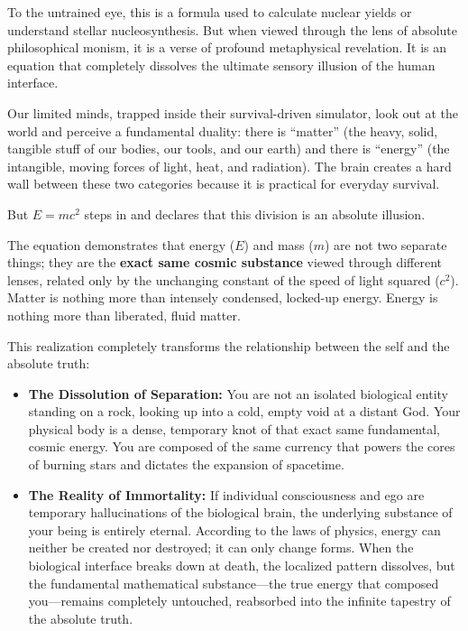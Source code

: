 \documentclass[12pt]{article}
\begin{document}
To the untrained eye, this is a formula used to calculate nuclear yields or understand stellar nucleosynthesis. But when viewed through the lens of absolute philosophical monism, it is a verse of profound metaphysical revelation. It is an equation that completely dissolves the ultimate sensory illusion of the human interface.

Our limited minds, trapped inside their survival-driven simulator, look out at the world and perceive a fundamental duality: there is ``matter'' (the heavy, solid, tangible stuff of our bodies, our tools, and our earth) and there is ``energy'' (the intangible, moving forces of light, heat, and radiation). The brain creates a hard wall between these two categories because it is practical for everyday survival. 

But $E=mc^2$ steps in and declares that this division is an absolute illusion. 

The equation demonstrates that energy ($E$) and mass ($m$) are not two separate things; they are the \textbf{exact same cosmic substance} viewed through different lenses, related only by the unchanging constant of the speed of light squared ($c^2$). Matter is nothing more than intensely condensed, locked-up energy. Energy is nothing more than liberated, fluid matter. 

This realization completely transforms the relationship between the self and the absolute truth:
\begin{itemize}
\item \textbf{The Dissolution of Separation:} You are not an isolated biological entity standing on a rock, looking up into a cold, empty void at a distant God. Your physical body is a dense, temporary knot of that exact same fundamental, cosmic energy. You are composed of the same currency that powers the cores of burning stars and dictates the expansion of spacetime.
\item \textbf{The Reality of Immortality:} If individual consciousness and ego are temporary hallucinations of the biological brain, the underlying substance of your being is entirely eternal. According to the laws of physics, energy can neither be created nor destroyed; it can only change forms. When the biological interface breaks down at death, the localized pattern dissolves, but the fundamental mathematical substance—the true energy that composed you—remains completely untouched, reabsorbed into the infinite tapestry of the absolute truth.
\end{itemize}
\end{document}
